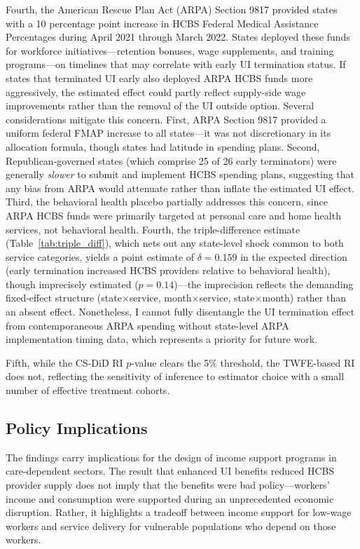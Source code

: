 \documentclass[12pt]{article}
\begin{document}
Fourth, the American Rescue Plan Act (ARPA) Section 9817 provided states with a 10 percentage point increase in HCBS Federal Medical Assistance Percentages during April 2021 through March 2022. States deployed these funds for workforce initiatives---retention bonuses, wage supplements, and training programs---on timelines that may correlate with early UI termination status. If states that terminated UI early also deployed ARPA HCBS funds more aggressively, the estimated effect could partly reflect supply-side wage improvements rather than the removal of the UI outside option. Several considerations mitigate this concern. First, ARPA Section 9817 provided a uniform federal FMAP increase to all states---it was not discretionary in its allocation formula, though states had latitude in spending plans. Second, Republican-governed states (which comprise 25 of 26 early terminators) were generally \textit{slower} to submit and implement HCBS spending plans, suggesting that any bias from ARPA would attenuate rather than inflate the estimated UI effect. Third, the behavioral health placebo partially addresses this concern, since ARPA HCBS funds were primarily targeted at personal care and home health services, not behavioral health. Fourth, the triple-difference estimate (Table~\ref{tab:triple_diff}), which nets out any state-level shock common to both service categories, yields a point estimate of $\delta = 0.159$ in the expected direction (early termination increased HCBS providers relative to behavioral health), though imprecisely estimated ($p = 0.14$)---the imprecision reflects the demanding fixed-effect structure (state$\times$service, month$\times$service, state$\times$month) rather than an absent effect. Nonetheless, I cannot fully disentangle the UI termination effect from contemporaneous ARPA spending without state-level ARPA implementation timing data, which represents a priority for future work.

Fifth, while the CS-DiD RI $p$-value clears the 5\% threshold, the TWFE-based RI does not, reflecting the sensitivity of inference to estimator choice with a small number of effective treatment cohorts.

\subsection{Policy Implications}

The findings carry implications for the design of income support programs in care-dependent sectors. The result that enhanced UI benefits reduced HCBS provider supply does not imply that the benefits were bad policy---workers' income and consumption were supported during an unprecedented economic disruption. Rather, it highlights a tradeoff between income support for low-wage workers and service delivery for vulnerable populations who depend on those workers.
\end{document}

